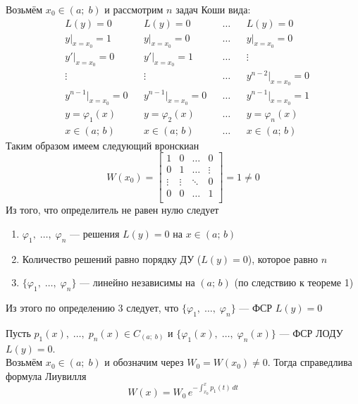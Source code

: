 \begin{Proof}
    Возьмём $x_0 \in (a;\;b)$ и рассмотрим $n$ задач Коши вида:
    \begin{align*}
        &L(y) = 0 && L(y) = 0 && \dots &&  L(y) = 0\\
        &y|_{x=x_0} = 1 && y|_{x=x_0} = 0 && \dots &&  y|_{x=x_0} = 0\\
        &y'|_{x=x_0} = 0 && y'|_{x=x_0} = 1 && \dots && \vdots \\
        &\vdots && \vdots && \dots && y^{n-2}|_{x=x_0} = 0\\
        &y^{n-1}|_{x=x_0} = 0 && y^{n-1}|_{x=x_0} = 0 && \dots && y^{n-1}|_{x=x_0} = 1\\
        & y = \varphi_1(x) && y = \varphi_2(x) && \dots && y = \varphi_n(x)\\
        & x \in(a;\,b) && x \in(a;\,b) && \dots  && x \in(a;\,b)
    \end{align*}
    Таким образом имеем следующий вронскиан
    \[
        W(x_0) = \begin{bmatrix}
            1 & 0 & \dots & 0\\
            0 & 1 & \dots & \vdots\\
            \vdots & \vdots & \ddots & 0\\
            0 & 0 & \dots & 1\\
        \end{bmatrix} = 1 \neq 0
    \]
    Из того, что определитель не равен нулю следует
    \begin{enumerate}
        \item $\varphi_1,\; \dots,\; \varphi_n$ --- решения $L(y) = 0$ на $x \in(a;\,b)$
        \item Количество решений равно порядку ДУ ($L(y) = 0$), которое равно $n$ 
        \item $\{\varphi_1,\; \dots,\; \varphi_n\}$ --- линейно независимы на $(a;\,b)$ (по следствию к теореме 1)
    \end{enumerate}
    Из этого по определению 3 следует, что $\{\varphi_1,\; \dots,\; \varphi_n\}$ --- ФСР $L(y) = 0$\\
\end{Proof}

\begin{Th}
    Пусть $p_1(x),\; \dots,\; p_n(x) \in C_{(a;\;b)}$ и $\{\varphi_1(x),\; \dots,\; \varphi_n(x)\}$ --- ФСР ЛОДУ $L(y) = 0$.\\
    
    Возьмём $x_0 \in (a;\;b)$ и обозначим через $W_0 = W(x_0) \neq 0$. Тогда справедлива формула Лиувилля
    \[
        W(x) = W_0\,e^{- \int_{x_0}^x p_1(t)\,dt}
    \]
\end{Th}

